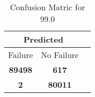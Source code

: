 \begin{table}[] 
\caption{Confusion Matric for 99.0} 
\label{Table: Prediction Accuracy-DMD99.0OnlySunEKF-combinationReflectionEKF-top2perfectNoFailurePrediction-Reflection} 
\centering 
\begin{tabular} 
 {@{}ccc@{}} 
\toprule 
\multicolumn{2}{c}{\textbf{Predicted}}
 \\ \midrule 
\multicolumn{1}{|c|}{Failure} & 
\multicolumn{1}{c|}{No Failure}
 \\ \midrule 
\multicolumn{1}{|c|}{\color{green}\textbf{89498}} & 
\multicolumn{1}{c|}{\color{red}\textbf{617}}
 \\ \midrule 
\multicolumn{1}{|c|}{\color{red}\textbf{2}} & 
\multicolumn{1}{c|}{\color{green}\textbf{80011}}
 \\ \bottomrule 
\end{tabular} 
\end{table} 
